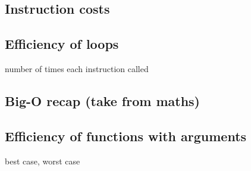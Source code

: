 
\subsection{Instruction costs}

\subsection{Efficiency of loops}
number of times each instruction called

\subsection{Big-O recap (take from maths)}

\subsection{Efficiency of functions with arguments}
best case, worst case

